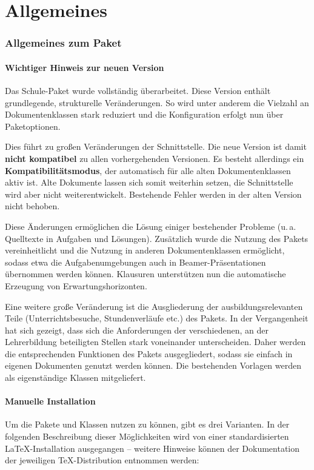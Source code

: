 \part{Allgemeines}

\section{Allgemeines zum Paket}

\subsection{Wichtiger Hinweis zur neuen Version}
	Das Schule-Paket wurde vollständig überarbeitet. Diese
	Version enthält grundlegende, strukturelle Veränderungen.
	So wird unter anderem die Vielzahl an Dokumentenklassen 
	stark reduziert und die Konfiguration erfolgt nun über
	Paketoptionen.
	
	Dies führt zu großen Veränderungen der Schnittstelle. Die
	neue Version ist damit \textbf{nicht kompatibel} zu allen
	vorhergehenden Versionen. Es besteht allerdings ein
	\textbf{Kompatibilitätsmodus}, der automatisch für alle alten
	Dokumentenklassen aktiv ist. Alte Dokumente lassen sich somit
	weiterhin setzen, die Schnittstelle wird aber nicht
	weiterentwickelt. Bestehende Fehler werden in der alten
	Version nicht behoben. 

	Diese Änderungen ermöglichen die Lösung einiger bestehender
	Probleme (u.\,a. Quelltexte in Aufgaben und Lösungen).
	Zusätzlich wurde die Nutzung des Pakets vereinheitlicht und
	die Nutzung in anderen Dokumentenklassen ermöglicht, sodass
	etwa die Aufgabenumgebungen auch in Beamer-Präsentationen
	übernommen werden können. Klausuren unterstützen nun die
	automatische Erzeugung von Erwartungshorizonten.

	Eine weitere große Veränderung ist die Ausgliederung der
	ausbildungsrelevanten Teile (Unterrichtsbesuche,
	Stundenverläufe etc.) des Pakets. In der
	Vergangenheit hat sich gezeigt, dass sich die Anforderungen der
	verschiedenen, an der Lehrerbildung beteiligten Stellen
	stark voneinander unterscheiden.
	Daher werden die entsprechenden Funktionen des Pakets
	ausgegliedert, sodass sie einfach in eigenen Dokumenten
	genutzt werden können. Die bestehenden Vorlagen werden
	als eigenständige Klassen mitgeliefert.

\subsection{Manuelle Installation}
	Um die Pakete und Klassen nutzen zu können, gibt es drei
	Varianten. In der folgenden Beschreibung dieser Möglichkeiten
	wird von einer standardisierten \LaTeX-Installation
	ausgegangen -- weitere Hinweise können der Dokumentation der
	jeweiligen \TeX-Distribution entnommen werden:
		
